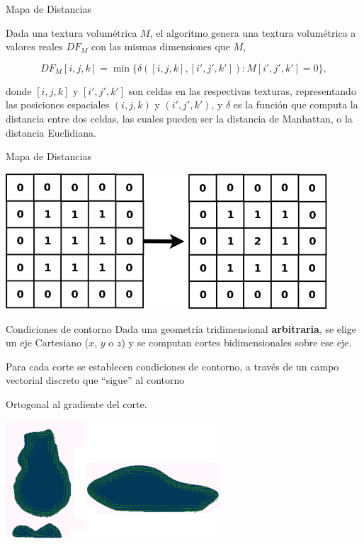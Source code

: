 \documentclass[spanish]{beamer}
\begin{document}
\begin{frame}{Mapa de Distancias}

Dada una textura volumétrica $M$, el algoritmo genera una textura volumétrica a valores reales $DF_{M}$ con las mismas dimensiones que $M$,


$$DF_{M}[i,j,k] = \min \bigg\{ \delta([i,j,k],[i',j',k']): M[i',j',k'] = 0 \bigg\},$$


\noindent donde $[i,j,k]$ y $[i',j',k']$ son celdas en las respectivas texturas, representando las posiciones espaciales $(i,j,k)$ y $(i',j',k')$, y $\delta$ es la función que computa la distancia entre dos celdas, las cuales pueden ser la distancia de Manhattan, o la distancia Euclidiana.

\end{frame}

\begin{frame}{Mapa de Distancias}

\centerline{\includegraphics[width=12cm]{../figures/distance}}

\end{frame}

\begin{frame}{Condiciones de contorno}
Dada una geometría tridimensional \textbf{arbitraria}, se elige un eje Cartesiano ($x$, $y$ o $z$) y se computan cortes bidimensionales sobre ese eje.

Para cada corte se establecen condiciones de contorno, a través de un campo vectorial discreto que ``sigue'' al contorno

Ortogonal al gradiente del corte.

  \centerline{\includegraphics[width=8cm]{../figures/Fig4}}
\end{frame}
\end{document}
